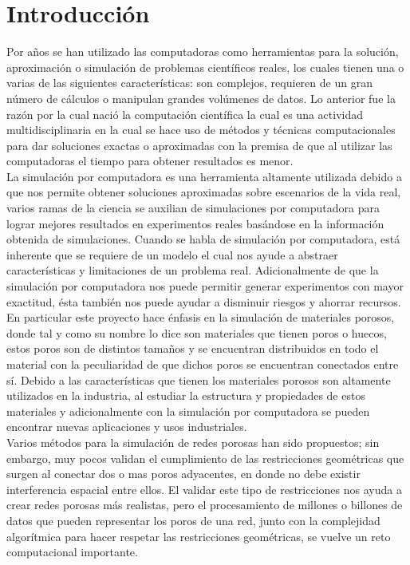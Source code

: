 \chapter{Introducción}
\label{champ:intro}
\bigskip
\barra
\bigskip

Por años se han utilizado las computadoras como herramientas para la solución, aproximación o simulación de problemas científicos reales, los cuales tienen una o varias de las siguientes características: son complejos, requieren de un gran número de cálculos o manipulan grandes volúmenes de datos. Lo anterior fue la razón por la cual nació la computación científica la cual es una actividad multidisciplinaria en la cual se hace uso de métodos y técnicas computacionales para dar soluciones exactas o aproximadas con la premisa de que al utilizar las computadoras el tiempo para obtener resultados es menor.\\

La simulación por computadora es una herramienta altamente utilizada debido a que nos permite obtener soluciones aproximadas sobre escenarios de la vida real, varios ramas de la ciencia se auxilian de simulaciones por computadora para lograr mejores resultados en experimentos reales basándose en la información obtenida de simulaciones. Cuando se habla de simulación por computadora, est\'a inherente que se requiere de un modelo el cual nos ayude a abstraer características y limitaciones de un problema real. Adicionalmente de que la simulación por computadora nos puede permitir generar experimentos con mayor exactitud, \'esta también nos puede ayudar a disminuir riesgos y ahorrar recursos.\\

En particular este proyecto hace énfasis en la simulación de materiales porosos, donde tal y como su nombre lo dice son materiales que tienen poros o huecos, estos poros son de distintos tamaños y se encuentran distribuidos en todo el material con la peculiaridad de que dichos poros se encuentran conectados entre s\'i. Debido a las características que tienen los materiales porosos son altamente utilizados en la industria, al estudiar la estructura y propiedades de estos materiales y adicionalmente con la simulación por computadora se pueden encontrar nuevas aplicaciones y usos industriales.\\

Varios m\'etodos para la simulaci\'on de redes porosas han sido propuestos; sin embargo, muy pocos validan el cumplimiento de las restricciones geom\'etricas que surgen al conectar dos o mas poros adyacentes, en donde no debe existir interferencia espacial entre ellos. El validar este tipo de restricciones nos ayuda a crear redes porosas m\'as realistas,
pero el procesamiento de millones o billones de datos que pueden representar los poros de una red, junto con la complejidad algor\'itmica para hacer respetar las restricciones geom\'etricas, se vuelve un reto computacional importante.\\

